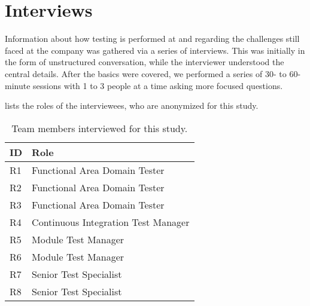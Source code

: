 \section{Interviews}
\label{sec:ind_interviews}


Information about how testing is performed at  and regarding the challenges still faced at the company was gathered via a series of interviews.
This was initially in the form of unstructured conversation, while the interviewer understood the central details.
After the basics were covered, we performed a series of 30- to 60-minute sessions with 1 to 3 people at a time asking more focused questions.

 lists the roles of the interviewees, who are anonymized for this study.

\begin{table}[]
\centering
{}
\begin{tabular}{ll}
\toprule
\textbf{ID} & \textbf{Role} \\
\midrule
R1 & Functional Area Domain Tester \\
R2 & Functional Area Domain Tester \\
R3 & Functional Area Domain Tester \\
R4 & Continuous Integration Test Manager \\
R5 & Module Test Manager \\
R6 & Module Test Manager \\
R7 & Senior Test Specialist \\
R8 & Senior Test Specialist \\
\bottomrule
\end{tabular}\\
\caption{Team members interviewed for this study.}
\label{table:interviewees}
\end{table}

%

